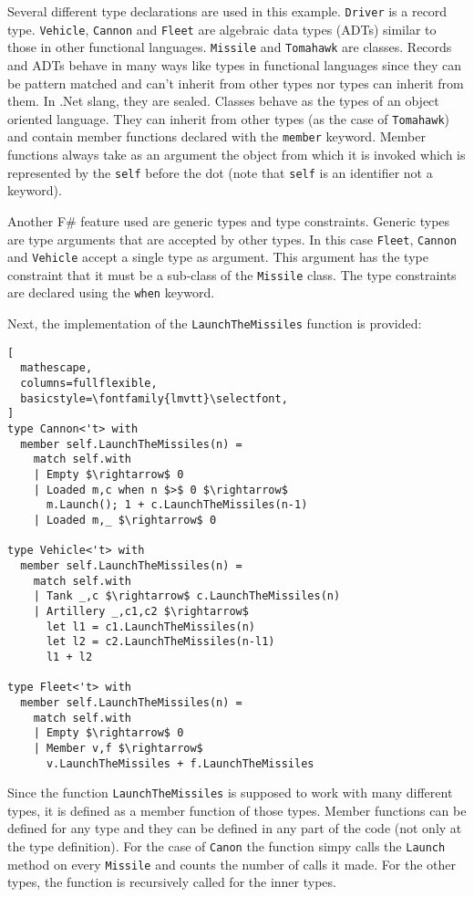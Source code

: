 \documentclass{sigplanconf}
\begin{document}
Several different type declarations are used in this example. \verb+Driver+ is a record type. \verb+Vehicle+, \verb+Cannon+ and \verb+Fleet+ are algebraic data types (ADTs) similar to those in other functional languages. \verb+Missile+ and \verb+Tomahawk+ are classes. Records and ADTs behave in many ways like types in functional languages since they can be pattern matched and can't inherit from other types nor types can inherit from them. In .Net slang, they are sealed. Classes behave as the types of an object oriented language. They can inherit from other types (as the case of \verb+Tomahawk+) and contain member functions declared with the \verb+member+ keyword. Member functions always take as an argument the object from which it is invoked which is represented by the \verb+self+ before the dot (note that \verb+self+ is an identifier not a keyword).

Another F\# feature used are generic types and type constraints. Generic types are type arguments that are accepted by other types. In this case \verb+Fleet+, \verb+Cannon+ and \verb+Vehicle+ accept a single type as argument. This argument has the type constraint that it must be a sub-class of the \verb+Missile+ class. The type constraints are declared using the \verb+when+ keyword.

Next, the implementation of the \verb+LaunchTheMissiles+ function is provided:
\begin{lstlisting}[
  mathescape,
  columns=fullflexible,
  basicstyle=\fontfamily{lmvtt}\selectfont,
]
type Cannon<'t> with
  member self.LaunchTheMissiles(n) = 
    match self.with
    | Empty $\rightarrow$ 0
    | Loaded m,c when n $>$ 0 $\rightarrow$ 
      m.Launch(); 1 + c.LaunchTheMissiles(n-1)
    | Loaded m,_ $\rightarrow$ 0

type Vehicle<'t> with
  member self.LaunchTheMissiles(n) =
    match self.with
    | Tank _,c $\rightarrow$ c.LaunchTheMissiles(n)
    | Artillery _,c1,c2 $\rightarrow$
      let l1 = c1.LaunchTheMissiles(n)
      let l2 = c2.LaunchTheMissiles(n-l1)
      l1 + l2

type Fleet<'t> with
  member self.LaunchTheMissiles(n) =
    match self.with
    | Empty $\rightarrow$ 0
    | Member v,f $\rightarrow$ 
      v.LaunchTheMissiles + f.LaunchTheMissiles
\end{lstlisting}
Since the function \verb+LaunchTheMissiles+ is supposed to work with many different types, it is defined as a member function of those types. Member functions can be defined for any type and they can be defined in any part of the code (not only at the type definition). For the case of \verb+Canon+ the function simpy calls the \verb+Launch+ method on every \verb+Missile+ and counts the number of calls it made. For the other types, the function is recursively called for the inner types.
\end{document}
